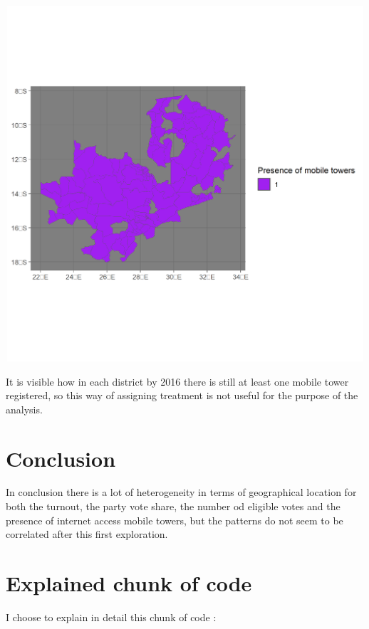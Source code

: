 \documentclass[
]{article}
\begin{document}
\includegraphics[width=6.25in,height=5.20833in]{treat2.png}

It is visible how in each district by 2016 there is still at least one
mobile tower registered, so this way of assigning treatment is not
useful for the purpose of the analysis.

\hypertarget{conclusion}{%
\section{Conclusion}\label{conclusion}}

In conclusion there is a lot of heterogeneity in terms of geographical
location for both the turnout, the party vote share, the number od
eligible votes and the presence of internet access mobile towers, but
the patterns do not seem to be correlated after this first exploration.

\hypertarget{explained-chunk-of-code}{%
\section{Explained chunk of code}\label{explained-chunk-of-code}}

I choose to explain in detail this chunk of code :
\end{document}
